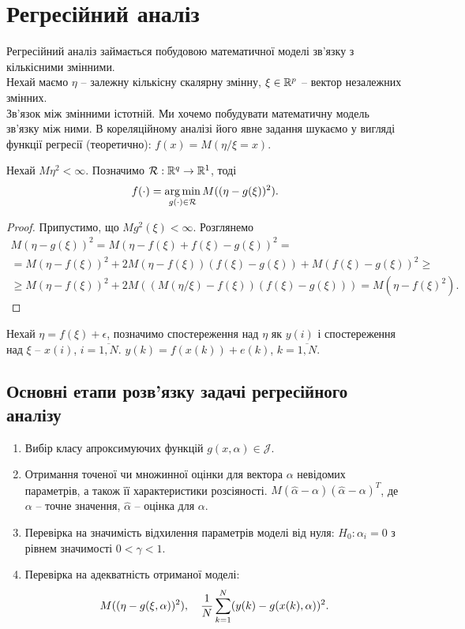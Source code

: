 \section{Регресійний аналіз}

Регресійний аналіз займається побудовою математичної моделі зв'язку з кількісними змінними. \\

Нехай маємо $\eta$ -- залежну кількісну скалярну змінну, $\xi \in \mathbb{R}^p$ -- вектор незалежних змінних.\\

Зв'язок між змінними істотній. Ми хочемо побудувати математичну модель зв'язку між ними. В кореляційному аналізі його явне задання шукаємо у вигляді функції регресії (теоретично): $f(x)=M(\eta/\xi=x)$.

\begin{lemma}
	Нехай $M\eta^2<\infty$. Позначимо $\mathcal{R}: \mathbb{R}^q\to\mathbb{R}^1$, тоді \[f(\cdot)=\operatorname*{arg\,min}_{g(\cdot)\in\mathcal{R}} M((\eta-g(\xi))^2).\]
\end{lemma}
\begin{proof}
	Припустимо, що $Mg^2(\xi)<\infty$. Розглянемо 
	\begin{multline*}
		M(\eta-g(\xi))^2 = M(\eta-f(\xi)+f(\xi)-g(\xi))^2 = \\
		= M(\eta-f(\xi))^2 + 2M(\eta-f(\xi))(f(\xi)-g(\xi))+M(f(\xi)-g(\xi))^2 \ge \\
		\ge M(\eta-f(\xi))^2 + 2M\left((M(\eta/\xi)-f(\xi))(f(\xi)-g(\xi))\right) = M(\eta-f(\xi)^2).
	\end{multline*}
\end{proof}

Нехай $\eta=f(\xi)+\epsilon$, позначимо спостереження над $\eta$ як $y(i)$ і спостереження над $\xi$ -- $x(i)$, $i = \overline{1, N}$. $y(k) = f(x(k)) + e(k)$, $k=\overline{1,N}$.

\subsection{Основні етапи розв'язку задачі регресійного аналізу}

\begin{enumerate}
	\item Вибір класу апроксимуючих функцій $g(x,\alpha)\in\mathcal{J}$.
	
	\item Отримання точеної чи множинної оцінки для вектора $\alpha$ невідомих параметрів, а також її характеристики розсіяності. $M(\widehat{\alpha}-\alpha)(\widehat{\alpha}-\alpha)^T$, де $\alpha$ -- точне значення, $\widehat{\alpha}$ -- оцінка для $\alpha$.

	\item Перевірка на значимість відхилення параметрів моделі від нуля: $H_0: \alpha_i = 0$ з рівнем значимості $0 < \gamma < 1$.

	\item Перевірка на адекватність отриманої моделі: \[ M((\eta-g(\xi,\alpha))^2), \quad \dfrac{1}{N}\displaystyle\sum\limits_{k=1}^N (y(k)-g(x(k),\alpha))^2. \]
\end{enumerate}

